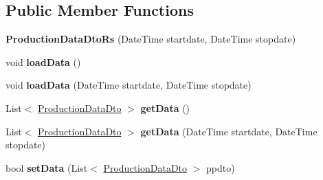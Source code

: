 \subsection*{Public Member Functions}
\begin{DoxyCompactItemize}
\item 
\mbox{\label{classkpi_mvc_api_1_1_data_transfer_objects_1_1_production_data_dto_rs_a1694f3f486bf07ce79efd887f9086d63}} 
{\bfseries Production\+Data\+Dto\+Rs} (Date\+Time startdate, Date\+Time stopdate)
\item 
\mbox{\label{classkpi_mvc_api_1_1_data_transfer_objects_1_1_production_data_dto_rs_a58fd92fa5a7191f03f2e0942afaaa65d}} 
void {\bfseries load\+Data} ()
\item 
\mbox{\label{classkpi_mvc_api_1_1_data_transfer_objects_1_1_production_data_dto_rs_a375b888daefaacc620cffef48ac7ab81}} 
void {\bfseries load\+Data} (Date\+Time startdate, Date\+Time stopdate)
\item 
\mbox{\label{classkpi_mvc_api_1_1_data_transfer_objects_1_1_production_data_dto_rs_abd52b81c37bd026514f480e3d6dd952b}} 
List$<$ \hyperlink{classkpi_mvc_api_1_1_data_transfer_objects_1_1_production_data_dto}{Production\+Data\+Dto} $>$ {\bfseries get\+Data} ()
\item 
\mbox{\label{classkpi_mvc_api_1_1_data_transfer_objects_1_1_production_data_dto_rs_ac36de1b8510fc1464a7ae2ab1c2e8b62}} 
List$<$ \hyperlink{classkpi_mvc_api_1_1_data_transfer_objects_1_1_production_data_dto}{Production\+Data\+Dto} $>$ {\bfseries get\+Data} (Date\+Time startdate, Date\+Time stopdate)
\item 
\mbox{\label{classkpi_mvc_api_1_1_data_transfer_objects_1_1_production_data_dto_rs_a403a889d4d7b6dbc5ddd07e85c660892}} 
bool {\bfseries set\+Data} (List$<$ \hyperlink{classkpi_mvc_api_1_1_data_transfer_objects_1_1_production_data_dto}{Production\+Data\+Dto} $>$ ppdto)

\end{DoxyCompactItemize}
